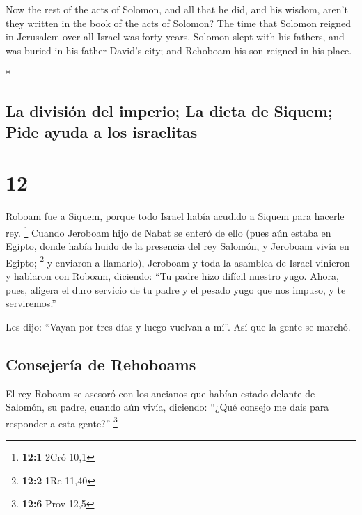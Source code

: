 \begin{paracol}{2}
\begin{otherlanguage}{english}
 Now the rest of the acts of Solomon, and all that he
did, and his wisdom, aren't they written in the book of the acts of
Solomon?  The time that Solomon reigned in Jerusalem over
all Israel was forty years.  Solomon slept with his
fathers, and was buried in his father David's city; and Rehoboam his son
reigned in his place.

\end{otherlanguage}

\switchcolumn[0]*

\hypertarget{la-divisiuxf3n-del-imperio-la-dieta-de-siquem-pide-ayuda-a-los-israelitas}{%
\subsection{La división del imperio; La dieta de Siquem; Pide ayuda a
los
israelitas}\label{la-divisiuxf3n-del-imperio-la-dieta-de-siquem-pide-ayuda-a-los-israelitas}}

\hypertarget{section-22}{%
\section{12}\label{section-22}}

 Roboam fue a Siquem, porque todo Israel había acudido a
Siquem para hacerle rey. \footnote{\textbf{12:1} 2Cró 10,1}
 Cuando Jeroboam hijo de Nabat se enteró de ello (pues aún
estaba en Egipto, donde había huido de la presencia del rey Salomón, y
Jeroboam vivía en Egipto; \footnote{\textbf{12:2} 1Re 11,40}
 y enviaron a llamarlo), Jeroboam y toda la asamblea de
Israel vinieron y hablaron con Roboam, diciendo:  ``Tu
padre hizo difícil nuestro yugo. Ahora, pues, aligera el duro servicio
de tu padre y el pesado yugo que nos impuso, y te serviremos.''

 Les dijo: ``Vayan por tres días y luego vuelvan a mí''.
Así que la gente se marchó.

\hypertarget{consejeruxeda-de-rehoboams}{%
\subsection{Consejería de Rehoboams}\label{consejeruxeda-de-rehoboams}}

 El rey Roboam se asesoró con los ancianos que habían
estado delante de Salomón, su padre, cuando aún vivía, diciendo: ``¿Qué
consejo me dais para responder a esta gente?'' \footnote{\textbf{12:6}
  Prov 12,5}


\end{paracol}
